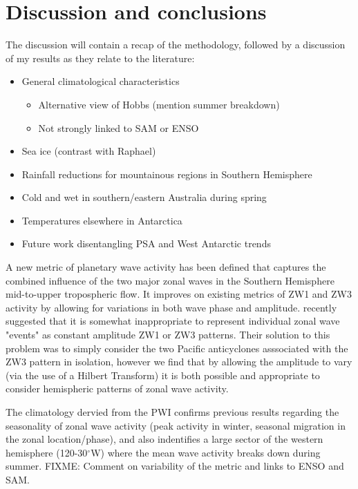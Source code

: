 \section{Discussion and conclusions}

The discussion will contain a recap of the methodology, followed by a discussion of my results as they relate to the literature:
\begin{itemize}
\item General climatological characteristics
\begin{itemize}
\item Alternative view of Hobbs (mention summer breakdown)
\item Not strongly linked to SAM or ENSO
\end{itemize}
\item Sea ice (contrast with Raphael)
\item Rainfall reductions for mountainous regions in Southern Hemisphere
\item Cold and wet in southern/eastern Australia during spring
\item Temperatures elsewhere in Antarctica
\item Future work disentangling PSA and West Antarctic trends
\end{itemize}

A new metric of planetary wave activity has been defined that captures the combined influence of the two major zonal waves in the Southern Hemisphere mid-to-upper tropospheric flow. It improves on existing metrics of ZW1 and ZW3 activity by allowing for variations in both wave phase and amplitude. \citet{Hobbs2010} recently suggested that it is somewhat inappropriate to represent individual zonal wave "events" as constant amplitude ZW1 or ZW3 patterns. Their solution to this problem was to simply consider the two Pacific anticyclones asssociated with the ZW3 pattern in isolation, however we find that by allowing the amplitude to vary (via the use of a Hilbert Transform) it is both possible and appropriate to consider hemispheric patterns of zonal wave activity.  

The climatology dervied from the PWI confirms previous results regarding the seasonality of zonal wave activity (peak activity in winter, seasonal migration in the zonal location/phase), and also indentifies a large sector of the western hemisphere (120-30$^{\circ}$W) where the mean wave activity breaks down during summer. FIXME: Comment on variability of the metric and links to ENSO and SAM.

